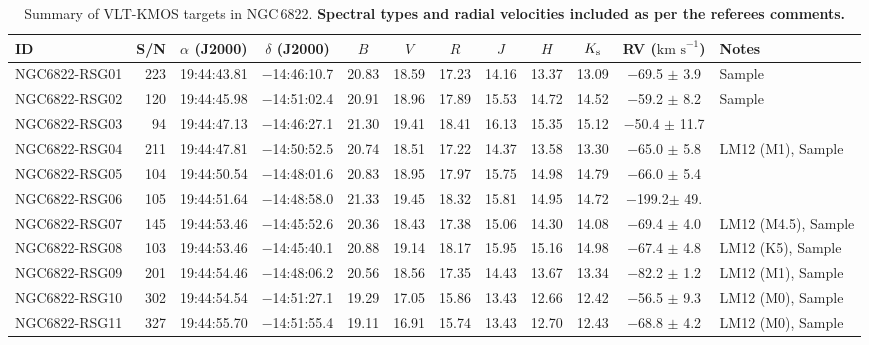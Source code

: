 \documentclass[iop]{emulateapj}
\def\kms{$\mbox{km s}^{-1}$}
\begin{document}
\begin{table*}
\caption{
        Summary of VLT-KMOS targets in NGC\,6822.
        \textbf{Spectral types and radial velocities included as per the referees comments.}\label{tb:obs-params}
        }
\scriptsize
\begin{center}
\begin{tabular}{lrcccccccccl}
 \hline
 \hline
ID & S/N & $\alpha$ (J2000) & $\delta$ (J2000) & $B$ & $V$ & $R$ & $J$ & $H$ & $K_{\rm s}$ & RV (\kms) & Notes \\
 \hline
NGC6822-RSG01 & 223 &   19:44:43.81  &  $-$14:46:10.7  &  20.83  &  18.59  &  17.23  &  14.16  &  13.37  &  13.09  & $-$69.5 $\pm$ 3.9 & Sample\\
NGC6822-RSG02 & 120 &   19:44:45.98  &  $-$14:51:02.4  &  20.91  &  18.96  &  17.89  &  15.53  &  14.72  &  14.52  & $-$59.2 $\pm$ 8.2 & Sample\\
NGC6822-RSG03 &  94 &   19:44:47.13  &  $-$14:46:27.1  &  21.30  &  19.41  &  18.41  &  16.13  &  15.35  &  15.12  & $-$50.4 $\pm$ 11.7 \\
NGC6822-RSG04 & 211 &   19:44:47.81  &  $-$14:50:52.5  &  20.74  &  18.51  &  17.22  &  14.37  &  13.58  &  13.30  & $-$65.0 $\pm$ 5.8 & LM12 (M1), Sample \\
NGC6822-RSG05 & 104 &   19:44:50.54  &  $-$14:48:01.6  &  20.83  &  18.95  &  17.97  &  15.75  &  14.98  &  14.79  & $-$66.0 $\pm$ 5.4 \\
NGC6822-RSG06 & 105 &   19:44:51.64  &  $-$14:48:58.0  &  21.33  &  19.45  &  18.32  &  15.81  &  14.95  &  14.72  & $-$199.2$\pm$ 49. \\
NGC6822-RSG07 & 145 &   19:44:53.46  &  $-$14:45:52.6  &  20.36  &  18.43  &  17.38  &  15.06  &  14.30  &  14.08  & $-$69.4 $\pm$ 4.0 & LM12 (M4.5), Sample \\
NGC6822-RSG08 & 103 &   19:44:53.46  &  $-$14:45:40.1  &  20.88  &  19.14  &  18.17  &  15.95  &  15.16  &  14.98  & $-$67.4 $\pm$ 4.8 & LM12 (K5), Sample \\
NGC6822-RSG09 & 201 &   19:44:54.46  &  $-$14:48:06.2  &  20.56  &  18.56  &  17.35  &  14.43  &  13.67  &  13.34  & $-$82.2 $\pm$ 1.2 & LM12 (M1), Sample\\
NGC6822-RSG10 & 302 &   19:44:54.54  &  $-$14:51:27.1  &  19.29  &  17.05  &  15.86  &  13.43  &  12.66  &  12.42  & $-$56.5 $\pm$ 9.3 & LM12 (M0), Sample \\
NGC6822-RSG11 & 327 &   19:44:55.70  &  $-$14:51:55.4  &  19.11  &  16.91  &  15.74  &  13.43  &  12.70  &  12.43  & $-$68.8 $\pm$ 4.2 & LM12 (M0), Sample \\

\end{tabular}
\end{center}
\end{table*}
\end{document}
